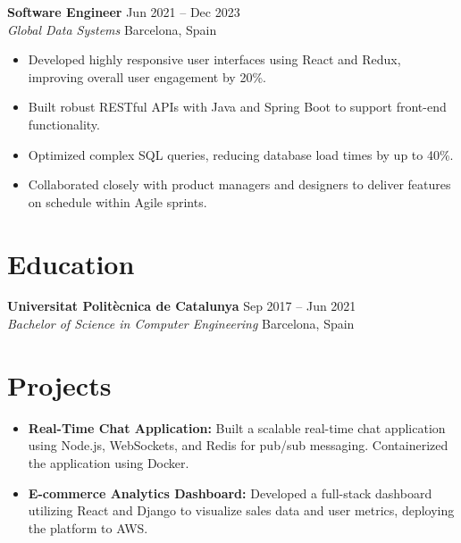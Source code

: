 \documentclass[a4paper,10pt]{article}
\begin{document}
\vspace{1ex}
\noindent
\textbf{Software Engineer} \hfill Jun 2021 -- Dec 2023 \\
\textit{Global Data Systems} \hfill Barcelona, Spain
\begin{itemize}[leftmargin=0.25in]
    \item Developed highly responsive user interfaces using React and Redux, improving overall user engagement by 20\%.
    \item Built robust RESTful APIs with Java and Spring Boot to support front-end functionality.
    \item Optimized complex SQL queries, reducing database load times by up to 40\%.
    \item Collaborated closely with product managers and designers to deliver features on schedule within Agile sprints.
\end{itemize}

\section*{Education}
\noindent
\textbf{Universitat Politècnica de Catalunya} \hfill Sep 2017 -- Jun 2021 \\
\textit{Bachelor of Science in Computer Engineering} \hfill Barcelona, Spain

\section*{Projects}
\begin{itemize}[leftmargin=0.15in, label={}]
    \item \textbf{Real-Time Chat Application:} Built a scalable real-time chat application using Node.js, WebSockets, and Redis for pub/sub messaging. Containerized the application using Docker.
    \item \textbf{E-commerce Analytics Dashboard:} Developed a full-stack dashboard utilizing React and Django to visualize sales data and user metrics, deploying the platform to AWS.
\end{itemize}
\end{document}
